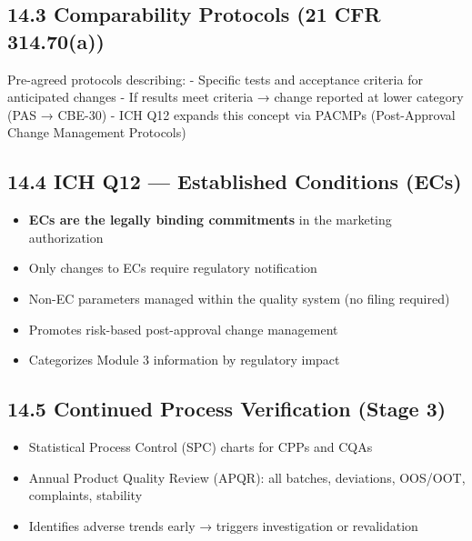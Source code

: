\documentclass[
  11pt,
  a4paper,
]{report}
\providecommand{\tightlist}{%
  \setlength{\itemsep}{0pt}\setlength{\parskip}{0pt}}
\begin{document}
\hypertarget{comparability-protocols-21-cfr-314.70a}{%
\subsection{14.3 Comparability Protocols (21 CFR
314.70(a))}\label{comparability-protocols-21-cfr-314.70a}}

Pre-agreed protocols describing: - Specific tests and acceptance
criteria for anticipated changes - If results meet criteria → change
reported at lower category (PAS → CBE-30) - ICH Q12 expands this concept
via PACMPs (Post-Approval Change Management Protocols)

\hypertarget{ich-q12-established-conditions-ecs}{%
\subsection{14.4 ICH Q12 --- Established Conditions
(ECs)}\label{ich-q12-established-conditions-ecs}}

\begin{itemize}
\tightlist
\item
  \textbf{ECs are the legally binding commitments} in the marketing
  authorization
\item
  Only changes to ECs require regulatory notification
\item
  Non-EC parameters managed within the quality system (no filing
  required)
\item
  Promotes risk-based post-approval change management
\item
  Categorizes Module 3 information by regulatory impact
\end{itemize}

\hypertarget{continued-process-verification-stage-3}{%
\subsection{14.5 Continued Process Verification (Stage
3)}\label{continued-process-verification-stage-3}}

\begin{itemize}
\tightlist
\item
  Statistical Process Control (SPC) charts for CPPs and CQAs
\item
  Annual Product Quality Review (APQR): all batches, deviations,
  OOS/OOT, complaints, stability
\item
  Identifies adverse trends early → triggers investigation or
  revalidation
\end{itemize}
\end{document}
